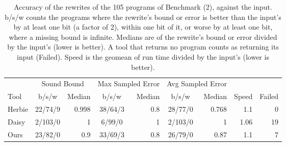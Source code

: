\begin{table}[H] \centering \small
\caption{Accuracy of the rewrites of the 105 programs of Benchmark (2), against the input. b/s/w counts the programs where the rewrite's bound or error is better than the input's by at least one bit (a factor of 2), within one bit of it, or worse by at least one bit, where a missing bound is infinite. Medians are of the rewrite's bound or error divided by the input's (lower is better). A tool that returns no program counts as returning its input (Failed). Speed is the geomean of run time divided by the input's (lower is better).}\label{tab:accuracy}
\begin{tabular}{lcrcrcrrr}
\toprule
& \multicolumn{2}{c}{Sound Bound} & \multicolumn{2}{c}{Max Sampled Error} & \multicolumn{2}{c}{Avg Sampled Error} & & \\
\cmidrule(lr){2-3}\cmidrule(lr){4-5}\cmidrule(lr){6-7}
Tool & b/s/w & Median & b/s/w & Median & b/s/w & Median & Speed & Failed \\
\midrule
Herbie & 22/74/9 & 0.998 & 38/64/3 & 0.8 & 28/77/0 & 0.768 & 1.1 & 0 \\
Daisy & 2/103/0 & 1 & 6/99/0 & 1 & 2/103/0 & 1 & 1.06 & 19 \\
Ours & 23/82/0 & 0.9 & 33/69/3 & 0.8 & 26/79/0 & 0.87 & 1.1 & 7 \\
\bottomrule
\end{tabular}
\end{table}
